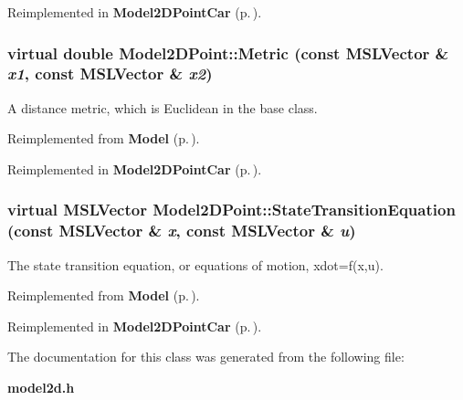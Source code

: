 Reimplemented in {\bf Model2DPoint\-Car} {\rm (p.\,\pageref{class_Model2DPointCar_a2})}.
\subsubsection{\setlength{\rightskip}{0pt plus 5cm}virtual double Model2DPoint::Metric (const {\bf MSLVector} \& {\em x1}, const {\bf MSLVector} \& {\em x2})\hspace{0.3cm}{\tt  [virtual]}}\label{class_Model2DPoint_a4}


A distance metric, which is Euclidean in the base class.



Reimplemented from {\bf Model} {\rm (p.\,\pageref{class_Model_a9})}.

Reimplemented in {\bf Model2DPoint\-Car} {\rm (p.\,\pageref{class_Model2DPointCar_a4})}.
\subsubsection{\setlength{\rightskip}{0pt plus 5cm}virtual {\bf MSLVector} Model2DPoint::State\-Transition\-Equation (const {\bf MSLVector} \& {\em x}, const {\bf MSLVector} \& {\em u})\hspace{0.3cm}{\tt  [virtual]}}\label{class_Model2DPoint_a3}


The state transition equation, or equations of motion, xdot=f(x,u).



Reimplemented from {\bf Model} {\rm (p.\,\pageref{class_Model_a3})}.

Reimplemented in {\bf Model2DPoint\-Car} {\rm (p.\,\pageref{class_Model2DPointCar_a3})}.

The documentation for this class was generated from the following file:\begin{CompactItemize}
\item 
{\bf model2d.h}\end{CompactItemize}
